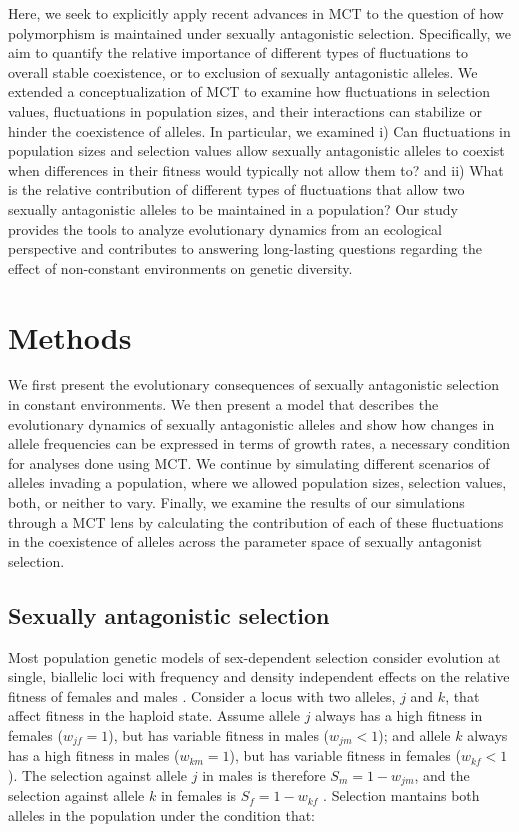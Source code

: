 \documentclass[12pt]{article}
\begin{document}
Here, we seek to explicitly apply recent  advances in MCT to the question of how
polymorphism is maintained under sexually antagonistic selection. Specifically, we aim to quantify the relative importance of different types of fluctuations to overall stable coexistence, or to exclusion of sexually antagonistic alleles. We extended a conceptualization of MCT \citep{ellner2016quantify,ellner_expanded_2019} to examine how fluctuations in selection values, fluctuations in population sizes, and their interactions can stabilize or hinder the coexistence of alleles. In particular, we examined  i) Can fluctuations in population sizes and selection values allow sexually antagonistic alleles to coexist when differences in their fitness would typically not allow them to? and ii) What is the relative contribution of different types of fluctuations that allow two sexually antagonistic alleles to be maintained in a population? Our study provides the tools to analyze evolutionary dynamics from an ecological perspective and contributes to answering long-lasting questions regarding the effect of non-constant environments on genetic diversity.



\section{Methods}

We first present the evolutionary consequences of sexually antagonistic selection in constant environments. We then present a model that describes the evolutionary dynamics of sexually antagonistic alleles and show how changes in allele frequencies can be expressed in terms of growth rates, a necessary condition for analyses done using MCT. We continue by simulating different scenarios of alleles invading a population, where we allowed population sizes, selection values, both, or neither to vary. Finally, we examine the results of our simulations through a MCT lens by calculating the contribution of each of these fluctuations in the coexistence of alleles across the parameter space of sexually antagonist selection.


\subsection*{Sexually antagonistic selection}

 Most population genetic models of sex-dependent selection consider evolution at single, biallelic  loci with frequency and density independent effects on the relative fitness of females and males \citep{wright1942statistical,kidwell1977regions, immler2012ploidally}. Consider a locus with two alleles, $j$ and $k$, that affect fitness in the haploid state.  Assume allele $j$ always has a high fitness in females ($w_{jf} = 1$), but has variable fitness in males ($w_{jm} < 1$); and allele $k$ always has a high fitness in males ($w_{km} = 1$), but has variable fitness in females ($w_{kf} < 1 $). The selection against allele $j$ in males is therefore $S_{m}= 1 - w_{jm}$, and the selection against allele $k$ in females is $S_{f}= 1 - w_{kf}$ . Selection mantains both alleles in the population under the condition that:
\end{document}
